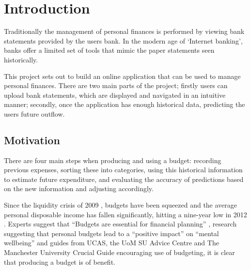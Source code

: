 \begin{comment}
This chapter puts the work into context. Having read it, the reader should be left in no doubt as to:

- the topic area to which the work applies
- why the work is being done
- what else has been done in the area and by whom
 - how the author proposes to tackle the problem: The project proposal is often expressed in terms of a main objective and possibly one or more additional objectives. It is useful to define "milestones" or "sub-goals" that mark the progress towards the objectives. 
 - It is common to end this chapter with a brief overview of each of the subsequent chapters of the report.
 
\end{comment}

\chapter{Introduction}
\label{cha:introduction}
Traditionally the management of personal finances is performed by viewing bank statements provided by the users bank. In the modern age of `Internet banking', banks offer a limited set of tools that mimic the paper statements seen historically.

This project sets out to build an online application that can be used to manage personal finances. There are two main parts of the project; firstly users can upload bank statements, which are displayed and navigated in an intuitive manner; secondly, once the application has enough historical data, predicting the users future outflow.

\section{Motivation}
There are four main steps when producing and using a budget: recording previous expenses, sorting these into categories, using this historical information to estimate future expenditure, and evaluating the accuracy of predictions based on the new information and adjusting accordingly.

Since the liquidity crisis of 2009 \parencite{gore2010}, budgets have been squeezed and the average personal disposable income has fallen significantly, hitting a nine-year low in 2012 \parencite{barnard2012households}. Experts suggest that ``Budgets are essential for financial planning'' \parencite{wsj2013budget}, research suggesting that personal budgets lead to a ``positive impact'' on ``mental wellbeing'' \parencite{tlap2013budget} and guides from UCAS, the UoM SU Advice Centre and The Manchester University Crucial Guide encouraging use of budgeting, it is clear that producing a budget is of benefit.

